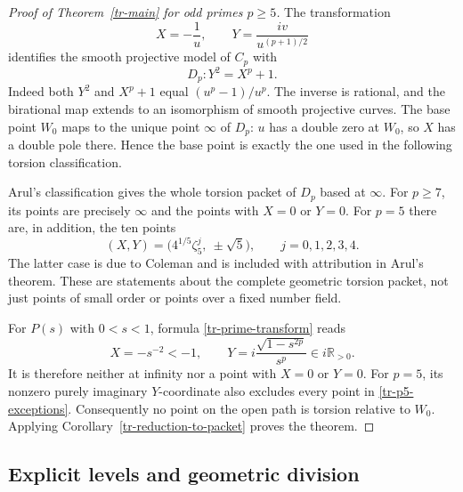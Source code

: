 \documentclass[11pt,a4paper]{article}
\theoremstyle{definition}
\theoremstyle{remark}
\numberwithin{equation}{section}
\begin{document}
\begin{proof}[Proof of Theorem~\ref{tr-main} for odd primes $p\geq5$]
The transformation
\begin{equation}\label{tr-prime-transform}
 X=-\frac1u,\qquad Y=\frac{iv}{u^{(p+1)/2}}
\end{equation}
identifies the smooth projective model of $C_p$ with
\begin{equation}\label{tr-prime-curve}
 D_p:Y^2=X^p+1.
\end{equation}
Indeed both $Y^2$ and $X^p+1$ equal $(u^p-1)/u^p$.  The inverse is
rational, and the birational map extends to an isomorphism of smooth
projective curves.  The base point $W_0$ maps to the unique point
$\infty$ of $D_p$: $u$ has a double zero at $W_0$, so $X$ has a double
pole there.  Hence the base point is exactly the one used in the
following torsion classification.

Arul's classification \cite[Theorem~6.2.21]{tr-arul} gives the whole
torsion packet of $D_p$ based at $\infty$.  For $p\geq7$, its points
are precisely $\infty$ and the points with $X=0$ or $Y=0$.  For $p=5$
there are, in addition, the ten points
\begin{equation}\label{tr-p5-exceptions}
 (X,Y)=\bigl(4^{1/5}\zeta_5^j,\ \pm\sqrt5\bigr),
 \qquad j=0,1,2,3,4.
\end{equation}
The latter case is due to Coleman and is included with attribution
in Arul's theorem.  These are statements about the complete geometric
torsion packet, not just points of small order or points over a fixed
number field.

For $P(s)$ with $0<s<1$, formula \eqref{tr-prime-transform} reads
\begin{equation}\label{tr-prime-real-image}
 X=-s^{-2}<-1,\qquad
 Y=i\frac{\sqrt{1-s^{2p}}}{s^p}\in i\mathbb R_{>0}.
\end{equation}
It is therefore neither at infinity nor a point with $X=0$ or $Y=0$.
For $p=5$, its nonzero purely imaginary $Y$-coordinate also excludes
every point in \eqref{tr-p5-exceptions}.  Consequently no point on
the open path is torsion relative to $W_0$.  Applying
Corollary~\ref{tr-reduction-to-packet} proves the theorem.
\end{proof}

\subsection{Explicit levels and geometric division}
\label{tr-subsec-consequences}
\end{document}

